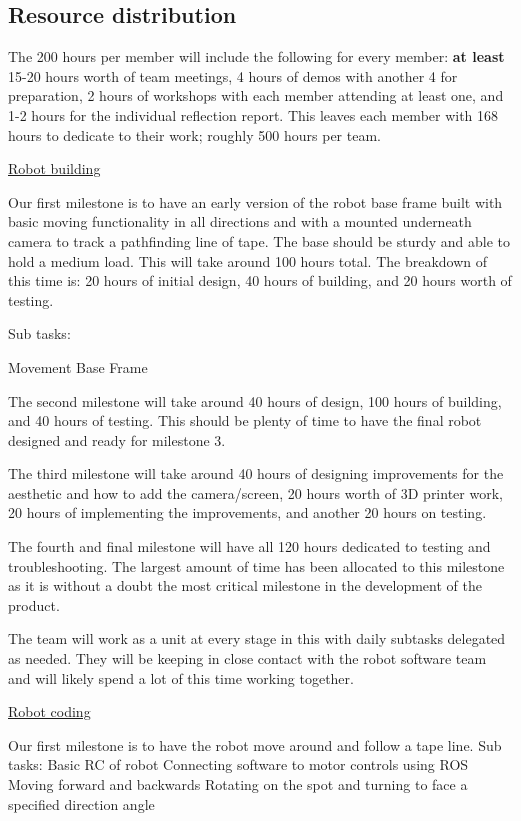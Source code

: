 \documentclass{article}
\begin{document}
\subsection{Resource distribution}

The 200 hours per member will include the following for every member: {\bf at least} 15-20 hours worth of team meetings, 4 hours of demos with another 4 for preparation, 2 hours of workshops with each member attending at least one, and 1-2 hours for the individual reflection report. This leaves each member with 168 hours to dedicate to their work; roughly 500 hours per team.


\underline{Robot building} 

Our first milestone is to have an early version of the robot base frame built with basic moving functionality in all directions and with a mounted underneath camera to track a pathfinding line of tape. The base should be sturdy and able to hold a medium load. This will take around 100 hours total. The breakdown of this time is: 20 hours of initial design, 40 hours of building, and 20 hours worth of testing.

Sub tasks:

Movement Base Frame
    

The second milestone will take around 40 hours of design, 100 hours of building, and 40 hours of testing. This should be plenty of time to have the final robot designed and ready for milestone 3.

The third milestone will take around 40 hours of designing improvements for the aesthetic and how to add the camera/screen, 20 hours worth of 3D printer work, 20 hours of implementing the improvements, and another 20 hours on testing.

The fourth and final milestone will have all 120 hours dedicated to testing and troubleshooting. The largest amount of time has been allocated to this milestone as it is without a doubt the most critical milestone in the development of the product.

The team will work as a unit at every stage in this with daily subtasks delegated as needed. They will be keeping in close contact with the robot software team and will likely spend a lot of this time working together.

\underline{Robot coding}

Our first milestone is to have the robot move around and follow a tape line.
Sub tasks: 
Basic RC of robot
    Connecting software to motor controls using ROS
    Moving forward and backwards
    Rotating on the spot and turning to face a specified direction angle
    
\end{document}

